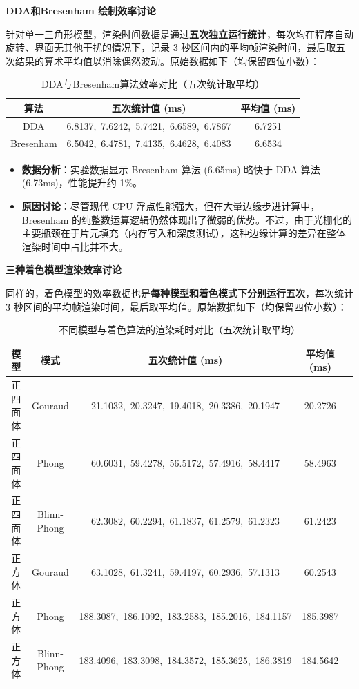 \documentclass[a4paper]{article}
\begin{document}
\textbf{DDA和Bresenham 绘制效率讨论}

针对单一三角形模型，渲染时间数据是通过\textbf{五次独立运行统计}，每次均在程序自动旋转、界面无其他干扰的情况下，记录 3 秒区间内的平均帧渲染时间，最后取五次结果的算术平均值以消除偶然波动。原始数据如下（均保留四位小数）：

\begin{table}[H]
    \centering
    \begin{tabular}{ccc}
        \toprule
        \textbf{算法} & \textbf{五次统计值 (ms)} & \textbf{平均值 (ms)} \\
        \midrule
        DDA & 6.8137,\ 7.6242,\ 5.7421,\ 6.6589,\ 6.7867 & 6.7251 \\
        Bresenham & 6.5042,\ 6.4781,\ 7.4135,\ 6.4628,\ 6.4083 & 6.6534 \\
        \bottomrule
    \end{tabular}
    \caption{DDA与Bresenham算法效率对比（五次统计取平均）}
\end{table}

\begin{itemize}
    \item \textbf{数据分析}：实验数据显示 Bresenham 算法 (6.65ms) 略快于 DDA 算法 (6.73ms)，性能提升约 1\%。
    \item \textbf{原因讨论}：尽管现代 CPU 浮点性能强大，但在大量边缘步进计算中，Bresenham 的纯整数运算逻辑仍然体现出了微弱的优势。不过，由于光栅化的主要瓶颈在于片元填充（内存写入和深度测试），这种边缘计算的差异在整体渲染时间中占比并不大。
\end{itemize}

\textbf{三种着色模型渲染效率讨论}

同样的，着色模型的效率数据也是\textbf{每种模型和着色模式下分别运行五次}，每次统计 3 秒区间的平均帧渲染时间，最后取平均值。原始数据如下（均保留四位小数）：

\begin{table}[H]
    \centering
    \begin{tabular}{ccccc}
        \toprule
        \textbf{模型} & \textbf{模式} & \textbf{五次统计值 (ms)} & \textbf{平均值 (ms)} \\
        \midrule
        正四面体 & Gouraud & 21.1032,\ 20.3247,\ 19.4018,\ 20.3386,\ 20.1947 & 20.2726 \\
        正四面体 & Phong & 60.6031,\ 59.4278,\ 56.5172,\ 57.4916,\ 58.4417 & 58.4963 \\
        正四面体 & Blinn-Phong & 62.3082,\ 60.2294,\ 61.1837,\ 61.2579,\ 61.2323 & 61.2423 \\
        正方体 & Gouraud & 63.1028,\ 61.3241,\ 59.4197,\ 60.2936,\ 57.1313 & 60.2543 \\
        正方体 & Phong & 188.3087,\ 186.1092,\ 183.2583,\ 185.2016,\ 184.1157 & 185.3987 \\
        正方体 & Blinn-Phong & 183.4096,\ 183.3098,\ 184.3572,\ 185.3625,\ 186.3819 & 184.5642 \\
        \bottomrule
    \end{tabular}
    \caption{不同模型与着色算法的渲染耗时对比（五次统计取平均）}
\end{table}
\end{document}
